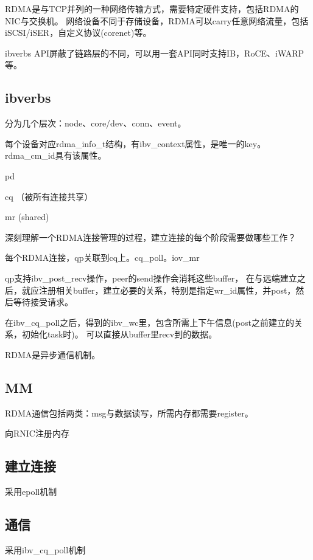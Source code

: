 RDMA是与TCP并列的一种网络传输方式，需要特定硬件支持，包括RDMA的NIC与交换机。
网络设备不同于存储设备，RDMA可以carry任意网络流量，包括iSCSI/iSER，自定义协议(corenet)等。

ibverbs API屏蔽了链路层的不同，可以用一套API同时支持IB，RoCE、iWARP等。

\subsection{ibverbs}

分为几个层次：node、core/dev、conn、event。

每个设备对应rdma\_info\_t结构，有ibv\_context属性，是唯一的key。
rdma\_cm\_id具有该属性。

\begin{itembox}
\item pd
\item cq （被所有连接共享）
\item mr  (shared)
\end{itembox}

深刻理解一个RDMA连接管理的过程，建立连接的每个阶段需要做哪些工作？

每个RDMA连接，qp关联到cq上。cq\_poll。iov\_mr

qp支持ibv\_post\_recv操作，peer的send操作会消耗这些buffer，
在与远端建立之后，就应注册相关buffer，建立必要的关系，特别是指定wr\_id属性，并post，然后等待接受请求。

在ibv\_cq\_poll之后，得到的ibv\_wc里，包含所需上下午信息(post之前建立的关系，初始化task时)。
可以直接从buffer里recv到的数据。

RDMA是异步通信机制。

\subsection{MM}

RDMA通信包括两类：msg与数据读写，所需内存都需要register。

向RNIC注册内存

\subsection{建立连接}

采用epoll机制

\subsection{通信}

采用ibv\_cq\_poll机制

